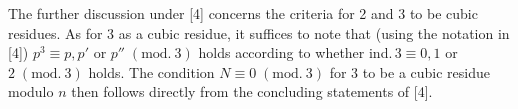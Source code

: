 The further discussion under [4] concerns the criteria for 2 and 3 to be cubic residues.
As for 3 as a cubic residue, it suffices to note that (using the notation in [4])
$p^3\equiv p, p'$ or $p''\;(\mathrm{mod.}\ 3)$ holds according to whether ind.\,$3\equiv 0, 1$ or $2\;(\mathrm{mod.}\ 3)$ holds. The condition
$N\equiv 0\;(\mathrm{mod.}\ 3)$ for 3 to be a cubic residue modulo $n$ then follows directly from the concluding statements of [4].

